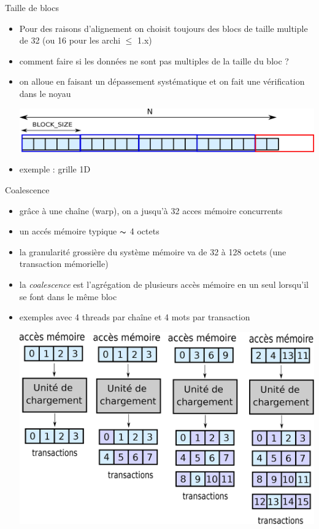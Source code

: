 \documentclass[11pt,mathserif]{beamer}
\newcommand{\scout}{\faAngellist}
\newcommand{\galde}{\faQuestion}
\newcommand{\argi}{\faLightbulbO}
\begin{document}
\begin{frame}{Taille de blocs}
  \begin{itemize}[<+->]
    \item[\scout] Pour des raisons d'alignement on choisit toujours des blocs de taille multiple de 32 (ou 16 pour les archi $\leqslant$ 1.x)
    \item[\galde] comment faire si les données ne sont pas multiples de la taille du bloc ?
    \item[\argi] on alloue en faisant un dépassement systématique et on fait une vérification dans le noyau
\begin{center}
\includegraphics[width=0.6\linewidth]{fig/grille_1D.eps}
\end{center}
    \item exemple : grille 1D
  
 \end{itemize}
\end{frame}
\begin{frame}{Coalescence}
  \begin{itemize}
    \item grâce à une chaîne (warp), on a jusqu'à 32 acces mémoire concurrents
    \item un accés mémoire typique $\thicksim$ 4 octets
    \item la granularité grossière du système mémoire va de 32 à 128 octets (une transaction mémorielle)
    \item[\argi] la {\em coalescence} est l'agrégation de plusieurs accès mémoire en un seul lorsqu'il se font dans le même bloc
   \item exemples avec 4 threads par chaîne et 4 mots par transaction
\begin{center}
\includegraphics[width=0.6\linewidth]{fig/coalescence.eps}
\end{center}
  \end{itemize}
\end{frame}
\end{document}
